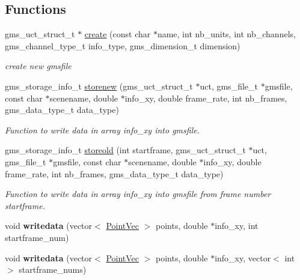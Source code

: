\subsection*{Functions}
\begin{DoxyCompactItemize}
\item 
gms\_\-uct\_\-struct\_\-t $\ast$ \hyperlink{namespaceGmswriter_acd8da6b7bf958abc172af5f4fc0d0f53}{create} (const char $\ast$name, int nb\_\-units, int nb\_\-channels, gms\_\-channel\_\-type\_\-t info\_\-type, gms\_\-dimension\_\-t dimension)
\begin{DoxyCompactList}\small\item\em create new gmsfile \end{DoxyCompactList}\item 
gms\_\-storage\_\-info\_\-t \hyperlink{namespaceGmswriter_a1115e4f56ea4bb83f7f3371184b54851}{storenew} (gms\_\-uct\_\-struct\_\-t $\ast$uct, gms\_\-file\_\-t $\ast$gmsfile, const char $\ast$scenename, double $\ast$info\_\-xy, double frame\_\-rate, int nb\_\-frames, gms\_\-data\_\-type\_\-t data\_\-type)
\begin{DoxyCompactList}\small\item\em Function to write data in array {\itshape info\_\-xy\/} into {\itshape gmsfile\/}. \end{DoxyCompactList}\item 
gms\_\-storage\_\-info\_\-t \hyperlink{namespaceGmswriter_a049a4fab3326776271491f92a4759141}{storeold} (int startframe, gms\_\-uct\_\-struct\_\-t $\ast$uct, gms\_\-file\_\-t $\ast$gmsfile, const char $\ast$scenename, double $\ast$info\_\-xy, double frame\_\-rate, int nb\_\-frames, gms\_\-data\_\-type\_\-t data\_\-type)
\begin{DoxyCompactList}\small\item\em Function to write data in array {\itshape info\_\-xy\/} into {\itshape gmsfile\/} from frame number {\itshape startframe\/}. \end{DoxyCompactList}\item 
\hypertarget{namespaceGmswriter_a09a159d437b4f57c05b8d1cbbdc89901}{
void {\bfseries writedata} (vector$<$ \hyperlink{namespaceGmswriter_ae29ac381dbacafec38fd0a06eff6e1ba}{PointVec} $>$ points, double $\ast$info\_\-xy, int startframe\_\-num)}
\label{namespaceGmswriter_a09a159d437b4f57c05b8d1cbbdc89901}

\item 
\hypertarget{namespaceGmswriter_adfc674e2401c4752813e827c7c8cd10f}{
void {\bfseries writedata} (vector$<$ \hyperlink{namespaceGmswriter_ae29ac381dbacafec38fd0a06eff6e1ba}{PointVec} $>$ points, double $\ast$info\_\-xy, vector$<$ int $>$ startframe\_\-nums)}
\label{namespaceGmswriter_adfc674e2401c4752813e827c7c8cd10f}


\end{DoxyCompactItemize}
